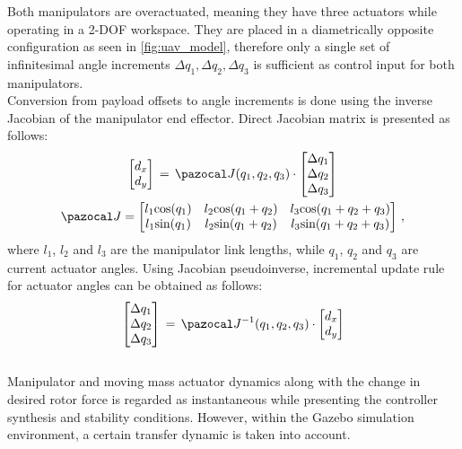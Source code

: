 Both manipulators are overactuated, meaning they have three actuators while operating in a 2-DOF workspace. They are placed in a diametrically opposite configuration as seen in \ref{fig:uav_model}, therefore only a single set of infinitesimal angle increments $\Delta q_1, \Delta q_2, \Delta q_3$ is sufficient as control input for both manipulators. \\
Conversion from payload offsets to angle increments is done using the inverse Jacobian of the manipulator end effector. Direct Jacobian matrix is presented as follows:
\begin{gather}
	\begin{bmatrix}
		d_x \\
		d_y
	\end{bmatrix}
	\, = \, 
	\Ja (q_1, q_2, q_3)
	\cdot 
	\begin{bmatrix}
		\Delta q_1 \\
		\Delta q_2 \\
		\Delta q_3
	\end{bmatrix} \\
	\Ja = 
	\begin{bmatrix}
		l_1\text{cos}(q_1) & l_2 \text{cos}(q_1 + q_2) & l_3 \text{cos}(q_1 + q_2 + q_3) \\
		l_1\text{sin}(q_1) & l_2 \text{sin}(q_1 + q_2) & l_3 \text{sin}(q_1 + q_2 + q_3) 
	\end{bmatrix} \, ,
\end{gather}
where $l_1$, $l_2$ and $l_3$ are the manipulator link lengths, while $q_1$, $q_2$ and $q_3$ are current actuator angles. Using Jacobian pseudoinverse, incremental update rule for actuator angles can be obtained as follows:
\begin{equation}
	\begin{bmatrix}
	\Delta q_1 \\
	\Delta q_2 \\
	\Delta q_3
	\end{bmatrix} 
	\, = \, \Ja^{-1} (q_1, q_2, q_3) \cdot
	\begin{bmatrix}
	d_x \\
	d_y
	\end{bmatrix}
\end{equation}
\\
Manipulator and moving mass actuator dynamics along with the change in desired rotor force is regarded as instantaneous while presenting the controller synthesis and stability conditions. However, within the Gazebo simulation environment, a certain transfer dynamic is taken into  account.